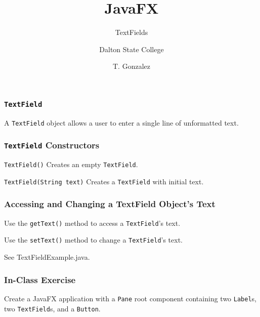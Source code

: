 \documentclass{beamer}
\title[TextFields]{JavaFX}
\subtitle{TextFields} %
\author[]{Dalton State College}
\date[T. Gonzalez]{T. Gonzalez}
\newcommand{\mil}[1]{\texttt{#1}}
\begin{document}
\begin{frame}

	\titlepage
	
\end{frame}

\begin{frame}
    
    \frametitle{\mil{TextField}}
    
    A \mil{TextField} object allows a user to enter a single line of unformatted text.  

\end{frame}
	
\begin{frame}[fragile]

	\frametitle{\mil{TextField} Constructors}
	
    \mil{TextField()}  Creates an empty \mil{TextField}.
    
    \bigskip
    
    \mil{TextField(String text)} Creates a \mil{TextField} with initial text.
	
\end{frame}

\begin{frame}[fragile]

    \frametitle{Accessing and Changing a TextField Object's Text}
    
    Use the \mil{getText()} method to access a \mil{TextField}'s text.
    
    \bigskip
    
    Use the \mil{setText()} method to change a \mil{TextField}'s text. 
    
\end{frame}

\begin{frame}

    See  TextFieldExample.java.
    
\end{frame}

\begin{frame}

    \frametitle{In-Class Exercise}
    
    Create a JavaFX application with a \mil{Pane} root component containing two \mil{Label}s, two \mil{TextField}s, and a \mil{Button}.
    
\end{frame}
\end{document}
